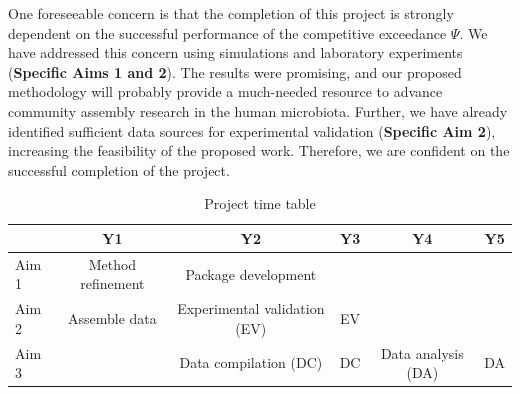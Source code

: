 \documentclass[12pt, class=article, crop=false]{standalone}
\begin{document}
One foreseeable concern is that the completion of this project is strongly dependent on the successful performance of the competitive exceedance $\Psi$.
We have addressed this concern using simulations and laboratory experiments  (\textbf{Specific Aims 1 and 2}).
The results were promising, and our proposed methodology will probably provide a much-needed resource to advance community assembly research in the human microbiota.
Further, we have already identified sufficient data sources for experimental validation (\textbf{Specific Aim 2}), increasing the feasibility of the proposed work.
Therefore, we are confident on the successful completion of the project.

\begin{table}
    \centering
    \caption{Project time table}
    \begin{tabular}{lccccc}
         & Y1 &  Y2 & Y3 & Y4 & Y5\\
         \hline
         Aim 1 & Method refinement & Package development & & & \\
         Aim 2 & Assemble data & Experimental validation (EV) & EV &  & \\
         Aim 3 & & Data compilation (DC) & DC & Data analysis (DA) & DA \\
    \end{tabular}
    \label{tab:tt}
\end{table}




\end{document}
